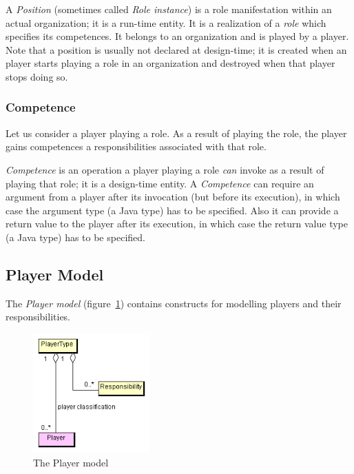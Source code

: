 A \textit{Position} (sometimes called \textit{Role instance}) is a role manifestation within an actual organization; it is a run-time entity.
It is a realization of a \textit{role} which specifies its competences.
It belongs to an organization and is played by a player.
Note that a position is usually not declared at design-time; it is created when an player starts playing a role in an organization and destroyed when that player stops doing so.

\subsubsection*{Competence}

Let us consider a player playing a role.
As a result of playing the role, the player gains competences a responsibilities associated with that role.

\textit{Competence} is an operation a player playing a role \textit{can} invoke as a result of playing that role; it is a design-time entity.
A \textit{Competence} can require an argument from a player after its invocation (but before its execution), in which case the argument type (a Java type) has to be specified.
Also it can provide a return value to the player after its execution, in which case the return value type (a Java type) has to be specified.

\subsection{Player Model}

The \textit{Player model} (figure~\ref{figure:thespian-player-model}) contains constructs for modelling players and their responsibilities.

\begin{figure}[ht]
	\centering
	\includegraphics[width=0.4\textwidth]{images/thespian/player-model}
	\caption{The Player model}
	\label{figure:thespian-player-model}
\end{figure}

